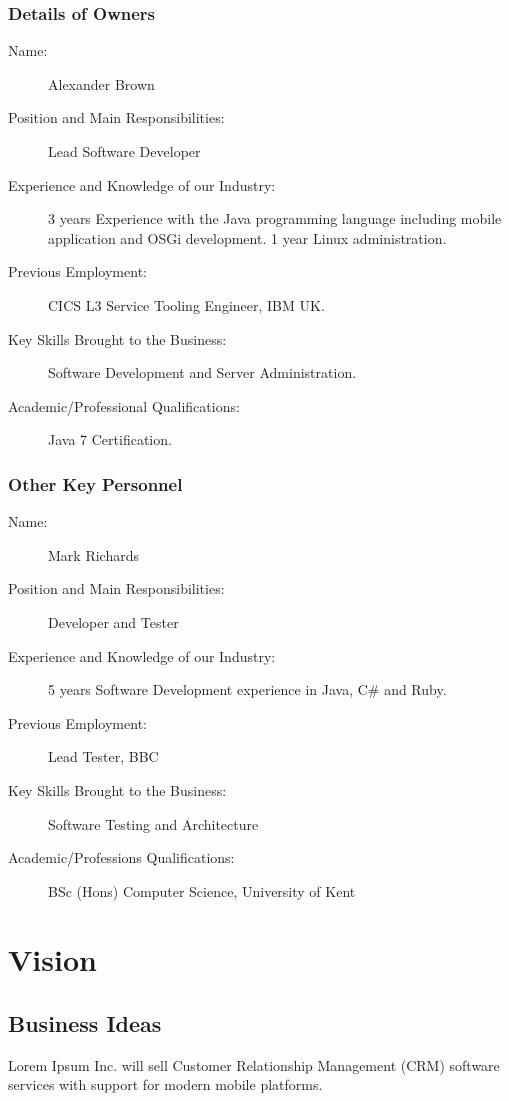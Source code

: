 \documentclass[DIV=calc, paper=a4, fontsize=11pt]{scrartcl}	 %
\begin{document}
\subsubsection*{Details of Owners}
\begin{description}
\item[Name:] Alexander Brown
\item[Position and Main Responsibilities:] Lead Software Developer
\item[Experience and Knowledge of our Industry:] 3 years Experience with the Java programming 
language including mobile application and OSGi development. 1 year Linux administration. %
\item[Previous Employment:] CICS L3 Service Tooling Engineer, IBM UK.
\item[Key Skills Brought to the Business:] Software Development and Server Administration.
\item[Academic/Professional Qualifications:] Java 7 Certification.
\end{description}

\subsubsection*{Other Key Personnel}
\begin{description}
\item[Name:] Mark Richards
\item[Position and Main Responsibilities:] Developer and Tester
\item[Experience and Knowledge of our Industry:] 5 years Software Development experience in Java, 
C\# and Ruby.
\item[Previous Employment:] Lead Tester, BBC
\item[Key Skills Brought to the Business:] Software Testing and Architecture
\item[Academic/Professions Qualifications:] BSc (Hons) Computer Science, University of Kent
\end{description}

\section{Vision}

\subsection{Business Ideas}
Lorem Ipsum Inc. will sell Customer Relationship Management (CRM) software services with support
for modern mobile platforms.
\end{document}
